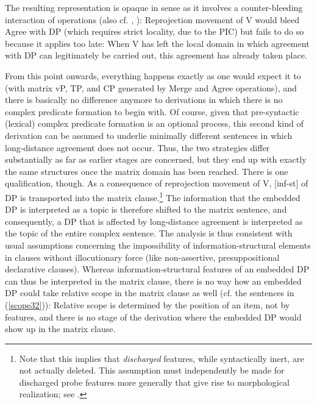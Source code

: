 \documentclass[output=paper
,modfonts
,nonflat]{langsci/langscibook}
\begin{document}
\newpage \noindent The resulting representation is opaque in 
	sense as it involves a counter-bleeding interaction of operations
	(also cf.  \citealt{Chomsky:51}, \citealt[25-26]{Chomsky:75:the}):
	Reprojection movement of V would bleed Agree with DP
	(which requires strict locality, due to the PIC) but fails to do so
	because it applies too late: When V has left the local domain in
	which agreement  with DP can legitimately be carried out, this
	agreement has already taken place. 
	
	From this point onwards, everything happens exactly as one would
	expect it to (with matrix vP, TP, and CP generated by Merge and Agree
	operations), and there is basically no difference anymore to
	derivations in which there is no complex predicate formation to begin
	with.  Of course, given that pre-syntactic (lexical) complex predicate
	formation is an optional process, this second kind of derivation can
	be assumed to underlie minimally different sentences in which
	long-distance agreement does not occur. Thus, the two strategies
	differ substantially as far as earlier stages are concerned, but they
	end up with exactly the same structures once the matrix domain has
	been reached. There is one qualification, though. 
	As a consequence of reprojection movement of V, [inf-st] of
	DP is
	transported into the matrix clause.\footnote{Note that this implies
		that {\itshape discharged} features, while syntactically inert, are not
		actually deleted. This assumption
		must independently be made for
		discharged probe features more generally that give rise to
		morphological realization; see \cite{Adger:03}.} 
	The information that the embedded DP\sub{{\rm\textit{ [inf-st]}}}
	is interpreted as a topic is therefore shifted to the matrix
	sentence, and consequently, a DP that is affected by long-distance
	agreement is interpreted as the topic of the entire complex sentence.
	The analysis is thus consistent with usual assumptions concerning the impossibility
	of information-struc\-tural elements in clauses without
	illocutionary force (like non-assertive, presuppositional
	declarative clauses). Whereas information-structural features of an
	embedded DP can thus be interpreted in the matrix clause, there is
	no way how an embedded DP could take relative scope in the matrix clause as
	well (cf. the sentences in (\ref{scope32})): Relative scope is
	determined by the position of an item, not by features, and there is no stage of
	the derivation where the embedded DP would show up in the
	matrix clause. 
	
\end{document}
